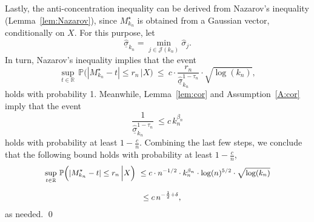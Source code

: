 \documentclass[aos,preprint]{imsart}
\numberwithin{equation}{section}
\theoremstyle{plain}
\newcommand{\R}{\mathbb{R}}
\renewcommand{\hat}[1]{\widehat{#1}}
\renewcommand{\P}{\mathbb{P}}
\newcommand{\ts}{\textstyle}
\newcommand{\1}{{\bf{1}}}
\newcommand{\0}{\mathbf{0}}
\begin{document}
Lastly, the anti-concentration inequality can be derived from Nazarov's inequality (Lemma~\ref{lem:Nazarov}), since $M_{k_n}^{\star}$ is obtained from a Gaussian vector, conditionally on $X$. For this purpose, let 
\begin{equation}
\hat{\underline{\sigma}}_{k_n}=\min_{j\in\mathcal{J}(k_n)}\hat\sigma_j.
\end{equation}
In turn, Nazarov's inequality implies that the event
\begin{equation}
\sup_{t\in\R}\, \P\Big(|M_{k_n}^{\star} -t|\leq r_n \, \Big| X\Big) \ \leq \ c\cdot \frac{r_n}{\hat{\underline{\sigma}}_{k_n}^{1-\tau_n}}\cdot \sqrt{\log(k_n)},
\end{equation}
holds with probability 1.
Meanwhile, Lemma~\ref{lem:cor} and Assumption~\ref{A:cor} imply that the event
\begin{equation}\label{eqn:minsigevent}
\frac{1}{\hat{\underline{\sigma}}_{k_n}^{1-\tau_n}} \ \leq c\, k_n^{\beta_n}
\end{equation}
holds with probability at least $1-\frac cn$. 
%
Combining the last few steps, we conclude that the following bound holds with probability at least $1-\frac cn$,
\begin{equation}
\small
\begin{split}
\sup_{t\in\R}\, \P\Big(|M_{k_n}^{\star} -t|\leq r_n \, \Big| X\Big)  \  & \leq \ts c\cdot n^{-1/2}\cdot k_n^{\beta_n}\cdot \log(n)^{5/2}\cdot\sqrt{\log(k_n)}\\[0.2cm]
%
& \ \leq  c\,n^{-\frac 12 +\delta},
\end{split}
\end{equation}
as needed.
%
\qed
\end{document}
